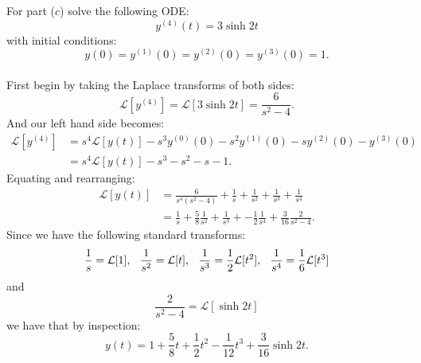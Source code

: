 \begin{enumerate}
    For part ($c$) solve the following ODE:
    $$y^{(4)}(t)=3\sinh 2t$$
    with initial conditions:
    $$y(0)=y^{(1)}(0)=y^{(2)}(0)=y^{(3)}(0)=1.$$ \\

    First begin by taking the Laplace transforms of both sides:
    $$\mathcal{L}[y^{(4)}]=\mathcal{L}[3\sinh 2t]
    =\frac{6}{s^2-4}.$$
    And our left hand side becomes:
    \begin{align*}
        \mathcal{L}[y^{(4)}]
        &=s^4\mathcal{L}[y(t)]-s^3 y^{(0)}(0)
        -s^2 y^{(1)}(0)-s y^{(2)}(0)-y^{(3)}(0) \\
        &=s^4\mathcal{L}[y(t)]-s^3-s^2-s-1.
    \end{align*}
    Equating and rearranging:
    \begin{align*}
        \mathcal{L}[y(t)]
        &=\frac{6}{s^4(s^2-4)}+\frac{1}{s}
        +\frac{1}{s^2}+\frac{1}{s^3}+\frac{1}{s^4} \\
        &=\frac{1}{s}+\frac{5}{8}\frac{1}{s^2}
        +\frac{1}{s^3}+-\frac{1}{2}\frac{1}{s^4}
        +\frac{3}{16}\frac{2}{s^2-4}.
    \end{align*}
    Since we have the following standard transforms:
    $$\frac{1}{s}=\mathcal{L}[1],\hspace{0.1in}
    \frac{1}{s^2}=\mathcal{L}[t],\hspace{0.1in}
    \frac{1}{s^3}=\frac{1}{2}\mathcal{L}[t^2],\hspace{0.1in}
    \frac{1}{s^4}=\frac{1}{6}\mathcal{L}[t^3]$$
    and
    $$\frac{2}{s^2-4}=\mathcal{L}[\sinh 2t]$$
    we have that by inspection:
    $$y(t)=1+\frac{5}{8}t+\frac{1}{2}t^2
    -\frac{1}{12}t^3+\frac{3}{16}\sinh 2t.$$

\end{enumerate}
